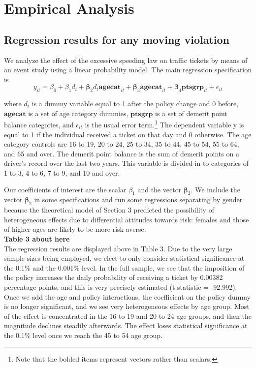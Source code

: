 \section{Empirical Analysis}
\label{sec:Empirical}


\subsection{Regression results for any moving violation}

We analyze the effect of the excessive speeding law on traffic tickets by means of an event study using a linear probability model. The main regression specification is
\begin{equation}
y_{it} = \beta_0 + \beta_1 d_t
      + \mathbf{\beta}_2 d_t \mathbf{agecat}_{it} + \mathbf{\beta}_3 \mathbf{agecat}_{it}
      + \mathbf{\beta}_4 \mathbf{ptsgrp}_{it}
      + \epsilon_{it}
\end{equation}

where $d_t$ is a dummy variable equal to 1 after the policy change and 0 before, $\mathbf{agecat}$ is a set of age category dummies, $\mathbf{ptsgrp}$ is a set of demerit point balance categories, and $\epsilon_{it}$ is the usual error term.\footnote{%
Note that the bolded items represent vectors rather than scalars.
}  
The dependent variable y is equal to 1 if the individual received a ticket on that day and 0 otherwise. The age category controls are 16 to 19, 20 to 24, 25 to 34, 35 to 44, 45 to 54, 55 to 64, and 65 and over. The demerit point balance is the sum of demerit points on a driver’s record over the last two years. This variable is divided in to categories of 1 to 3, 4 to 6, 7 to 9, and 10 and over.

Our coefficients of interest are the scalar $\beta_1$ and the vector $\mathbf{\beta}_2$. We include the vector $\mathbf{\beta}_2$ in some specifications and run some regressions separating by gender because the theoretical model of Section 3 predicted the possibility of heterogeneous effects due to differential attitudes towards risk: females and those of higher ages are likely to be more risk averse. \\

\textbf{Table 3 about here} \\

The regression results are displayed above in Table 3. Due to the very large sample sizes being employed, we elect to only consider statistical significance at the 0.1\% and the 0.001\% level. In the full sample, we see that the imposition of the policy increases the daily probability of receiving a ticket by 0.00382 percentage points, and this is very precisely estimated (t-statistic = -92.992). Once we add the age and policy interactions, the coefficient on the policy dummy is no longer significant, and we see very heterogeneous effects by age group. Most of the effect is concentrated in the 16 to 19 and 20 to 24 age groups, and then the magnitude declines steadily afterwards. The effect loses statistical significance at the 0.1\% level once we reach the 45 to 54 age group.

